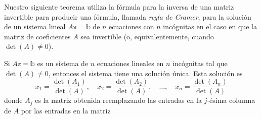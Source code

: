 Nuestro siguiente teorema utiliza la fórmula para la inversa de una matriz invertible para producir una fórmula, llamada \emph{regla de Cramer}, para la solución de un sistema lineal $A\mathbb{x} = \mathbb{b}$ de $n$ ecuaciones con $n$ incógnitas en el caso en que la matriz de coeficientes $A$ sea invertible (o, equivalentemente, cuando $\det(A) \neq 0$).

\begin{theorem}{}{}
    Si $A\mathbb{x} = \mathbb{b}$ es un sistema de $n$ ecuaciones lineales en $n$ incógnitas tal que $\det(A) \neq 0$, entonces el sistema tiene una solución única. Esta solución es
    $$x_1 = \frac{\det(A_1)}{\det(A)}, \quad x_2 = \frac{\det(A_2)}{\det(A)}, \quad \dots, \quad x_n = \frac{\det(A_n)}{\det(A)}$$
    donde $A_j$ es la matriz obtenida reemplazando las entradas en la $j$-ésima columna de $A$ por las entradas en la matriz
    \begin{matrizn}
    \end{matrizn}


\end{theorem}
